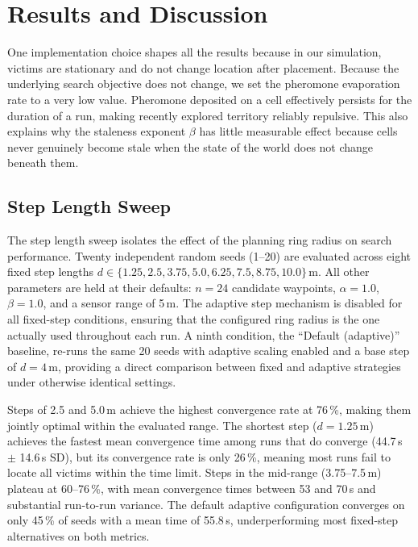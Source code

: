 \section{Results and Discussion}

One implementation choice shapes all the results because in our simulation, victims are stationary and do not change location after placement. Because the underlying search objective does not change, we set the pheromone evaporation rate to a very low value. Pheromone deposited on a cell effectively persists for the duration of a run, making recently explored territory reliably repulsive. This also explains why the staleness exponent $\beta$ has little measurable effect because cells never genuinely become stale when the state of the world does not change beneath them.

\subsection{Step Length Sweep}

The step length sweep isolates the effect of the planning ring radius on search performance.
Twenty independent random seeds (1--20) are evaluated across eight fixed step lengths
$d \in \{1.25, 2.5, 3.75, 5.0, 6.25, 7.5, 8.75, 10.0\}$\,m.
All other parameters are held at their defaults: $n = 24$ candidate waypoints,
$\alpha = 1.0$, $\beta = 1.0$, and a sensor range of 5\,m.
The adaptive step mechanism is disabled for all fixed-step conditions, ensuring that the
configured ring radius is the one actually used throughout each run.
A ninth condition, the ``Default (adaptive)'' baseline, re-runs the same 20 seeds with
adaptive scaling enabled and a base step of $d = 4$\,m, providing a direct comparison
between fixed and adaptive strategies under otherwise identical settings.

Steps of 2.5 and 5.0\,m achieve the highest convergence rate at 76\,\%, making them jointly
optimal within the evaluated range.
The shortest step ($d = 1.25$\,m) achieves the fastest mean convergence time among runs that
do converge (44.7\,s $\pm$ 14.6\,s SD), but its convergence rate is only 26\,\%,
meaning most runs fail to locate all victims within the time limit.
Steps in the mid-range (3.75--7.5\,m) plateau at 60--76\,\%, with mean convergence times
between 53 and 70\,s and substantial run-to-run variance.
The default adaptive configuration converges on only 45\,\% of seeds with a mean time
of 55.8\,s, underperforming most fixed-step alternatives on both metrics.

